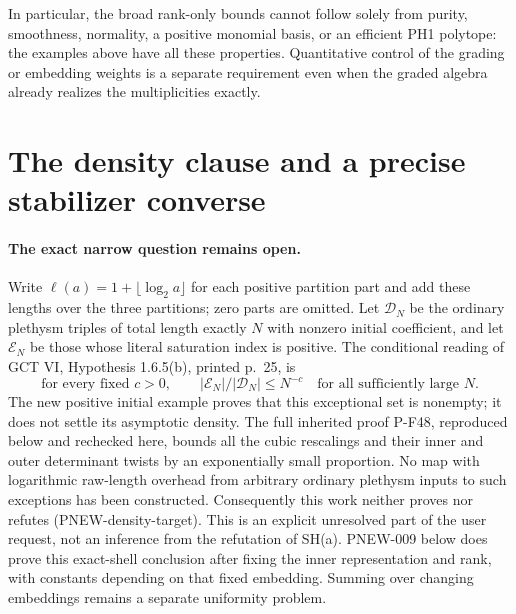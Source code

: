 In particular, the broad rank-only bounds cannot follow solely from
purity, smoothness, normality, a positive monomial basis, or an
efficient PH1 polytope: the examples above have all these properties.
Quantitative control of the grading or embedding weights is a
separate requirement even when the graded algebra already realizes
the multiplicities exactly.



\section{The density clause and a precise stabilizer converse}
\label{sec:plethysm-density-converse}

\paragraph{The exact narrow question remains open.}
Write $\ell(a)=1+\lfloor\log_2a\rfloor$ for each positive
partition part and add these lengths over the three partitions;
zero parts are omitted.  Let $\mathcal D_N$ be the ordinary
plethysm triples of total length exactly $N$ with nonzero initial
coefficient, and let $\mathcal E_N$ be those whose literal
saturation index is positive.  The conditional reading of
GCT VI, Hypothesis 1.6.5(b), printed p.~25, is
\[
 \text{for every fixed }c>0,\qquad
          |\mathcal E_N|/|\mathcal D_N|\le N^{-c}
                  \quad\text{for all sufficiently large }N.
 \tag{PNEW-density-target}
\]
The new positive initial example proves that this exceptional
set is nonempty; it does not settle its asymptotic density.
The full inherited proof P-F48, reproduced below and rechecked
here, bounds all the cubic rescalings and their inner and outer
determinant twists by an exponentially small proportion.
No map with logarithmic raw-length overhead from arbitrary
ordinary plethysm inputs to such exceptions has been constructed.
Consequently this work neither proves nor refutes
(PNEW-density-target).  This is an explicit unresolved part of
the user request, not an inference from the refutation of SH(a).
PNEW-009 below does prove this exact-shell conclusion after
fixing the inner representation and rank, with constants
depending on that fixed embedding.  Summing over changing
embeddings remains a separate uniformity problem.

